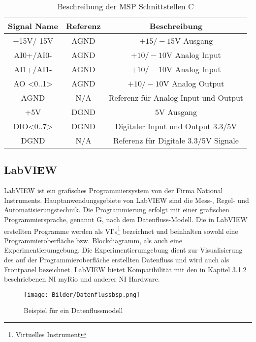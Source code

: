 \begin{table}[H]
	\centering
	\begin{tabular}{c|c|c}
		\hline
		Signal Name       &       Referenz        &           Beschreibung      \\ \hline
		+15V/-15V  & AGND &        $+15/-15\si{ \volt}$ Ausgang      \\
		AI0+/AI0-   &     AGND   &    $+10/-10\si{ \volt}$  Analog Input      \\
		AI1+/AI1-   &     AGND   &      $+10/-10\si{ \volt}$  Analog Input      \\   
		AO <0..1>   &     AGND   &     $+10/-10\si{ \volt}$  Analog Output      \\
		AGND   &     N/A   &       Referenz für Analog Input und Output      \\
		+5V&     DGND &        $5\si{\volt}$ Ausgang    \\
		DIO<0..7> &     DGND &        Digitaler Input und Output $3.3/5\si{ \volt}$ \\
		DGND&     N/A &       Referenz für Digitale $3.3/5\si{ \volt}$ Signale  \\
		\hline
	\end{tabular}
	\caption{Beschreibung der MSP Schnittstellen C}
	\label{x}
\end{table}



\subsection{LabVIEW}

LabVIEW ist ein grafisches Programmiersystem von der Firma National Instruments. Hauptanwendungsgebiete von LabVIEW sind die Mess-, Regel- und Automatisierungstechnik. Die Programmierung erfolgt mit einer grafischen Programmiersprache, genannt G, nach dem Datenfluss-Modell.\newline
Die in LabVIEW erstellten Programme werden als VI's\footnote{Virtuelles Instrument} bezeichnet und beinhalten sowohl eine Programmieroberfläche bzw. Blockdiagramm, als auch eine Experimentierumgebung. Die Experimentierumgebung dient zur Visualisierung des auf der Programmieroberfläche erstellten Datenfluss und wird auch als Frontpanel bezeichnet. LabVIEW bietet Kompatibilität mit den in Kapitel 3.1.2 beschriebenen NI myRio und anderer NI Hardware.\cite{myrio}

\begin{figure}[H]
	\centering
	\texttt{[image: Bilder/Datenflussbsp.png]} %
	\caption{Beispiel für ein Datenflussmodell }
	\label{fig: Beispiel für ein Datenflussmodell}
\end{figure}

